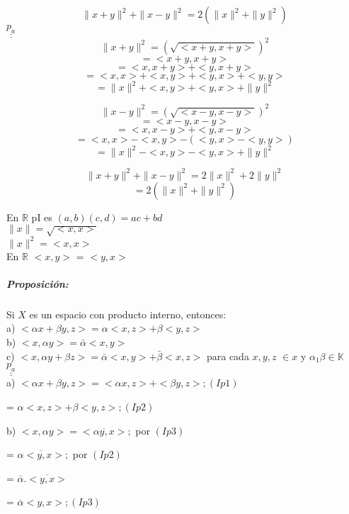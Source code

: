 			 \[ \parallel x+y \parallel^{2}  + \parallel x-y \parallel^{2} = 2(  \parallel x \parallel^{2} + \parallel y \parallel^{2}  ) \] 
			 $\underline{\underline{p_{a}}}$ \\			 
			\[ \parallel x+y\parallel ^{2} = (\sqrt{<x+y , x+y>})^{2} \]
			\[ = {<x+y , x+y>} \]
			\[ = {<x, x+y> +<y,  x+y>} \]
			\[ =<x, x>+<x, y>+<y, x>+<y, y> \]
			\[ =\parallel x \parallel ^{2}+<x, y>+<y, x>+\parallel y \parallel ^{2} \]
			
			\[ \parallel x-y\parallel ^{2} = (\sqrt{<x-y , x-y>})^{2} \]
			\[ = {<x-y , x-y>} \]
			\[ = {<x, x-y> +<y,  x-y>} \]
			\[ =<x, x>-<x, y>-(<y, x>-<y, y>) \]
			\[ =\parallel x \parallel ^{2}-<x, y>-<y, x>+\parallel y \parallel ^{2} \]
			
			\[ \parallel x+y \parallel^{2}  + \parallel x-y \parallel^{2} = 2 \parallel x \parallel^{2} + 2\parallel y \parallel^{2}  \] 
				 \[ = 2( \parallel x \parallel^{2} + \parallel y \parallel^{2}) \] 
				 
		En $\mathbb{R} $ pI es $(a, b)(c, d) = ac + bd$\\
		$\parallel x \parallel = \sqrt{<x, x>}$\\
		$\parallel x \parallel^{2}= <x, x>$\\
		En $\mathbb{R}$ $<x, y>$ = $<y, x>$
	\subparagraph{Proposición:}  Si $X$ es un espacio con producto interno, entonces:\\
a) $ <\alpha x + \beta y, z> = \alpha <x,z> + \beta <y, z>$\\
b) $<x, \alpha y> = \bar{\alpha} <x, y>$\\
c) $<x, \alpha y + \beta z> = \bar{\alpha}<x, y> + \bar{\beta}<x, z>$ para cada $x, y, z$  $\in x$ y $\alpha_{1} \beta \in{\mathbb{K}}$  \\

$\underline{\underline{p_{a}}}$ \\

a) $<\alpha x + \beta y, z>= <\alpha x, z>+<\beta y, z>; (Ip1)$

{\setlength{\parindent}{1.28in}= $\alpha<x, z>+\beta<y, z>; (Ip2)$}

b) $<x, \alpha y> = <\overline{\alpha y ,x}> ;$ por $ (Ip3) $

{\setlength{\parindent}{0.9in}= $\overline{\alpha<y, x>} ;$ por $ (Ip2)$}

{\setlength{\parindent}{0.9in}= $\overline{\alpha} . \overline{<y, x>} $}

{\setlength{\parindent}{0.9in}= $\overline{\alpha}  {<y, x>} ; (Ip3)$}

